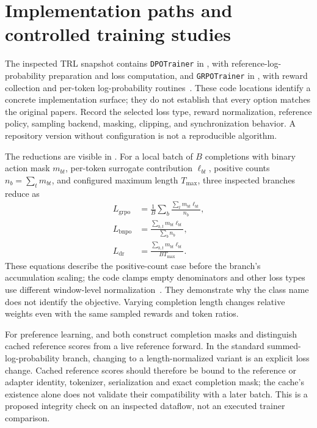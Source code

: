 \section{Implementation paths and controlled training studies}
\label{sec:C08:implementation}
The inspected TRL snapshot contains \texttt{DPOTrainer} in , with reference-log-probability preparation and loss computation, and \texttt{GRPOTrainer} in , with reward collection and per-token log-probability routines~\cite{rewrite_trl_repo}. These code locations identify a concrete implementation surface; they do not establish that every option matches the original papers. Record the selected loss type, reward normalization, reference policy, sampling backend, masking, clipping, and synchronization behavior. A repository version without configuration is not a reproducible algorithm.

The reductions are visible in . For a local batch of $B$ completions with binary action mask $m_{bt}$, per-token surrogate contribution $\ell_{bt}$, positive counts $n_b=\sum_tm_{bt}$, and configured maximum length $T_{\max}$, three inspected branches reduce as
\begin{equation}
\begin{aligned}
 L_{\mathrm{grpo}}&=\frac1B\sum_b\frac{\sum_tm_{bt}\ell_{bt}}{n_b},\\
 L_{\mathrm{bnpo}}&=\frac{\sum_{b,t}m_{bt}\ell_{bt}}{\sum_bn_b},\\
 L_{\mathrm{dr}}&=\frac{\sum_{b,t}m_{bt}\ell_{bt}}{BT_{\max}}.
\end{aligned}
\end{equation}
These equations describe the positive-count case before the branch's accumulation scaling; the code clamps empty denominators and other loss types use different window-level normalization~\cite{rewrite_trl_repo}. They demonstrate why the class name does not identify the objective. Varying completion length changes relative weights even with the same sampled rewards and token ratios.

For preference learning,  and  both construct completion masks and distinguish cached reference scores from a live reference forward. In the standard summed-log-probability branch, changing to a length-normalized variant is an explicit loss change. Cached reference scores should therefore be bound to the reference or adapter identity, tokenizer, serialization and exact completion mask; the cache's existence alone does not validate their compatibility with a later batch. This is a proposed integrity check on an inspected dataflow, not an executed trainer comparison.


